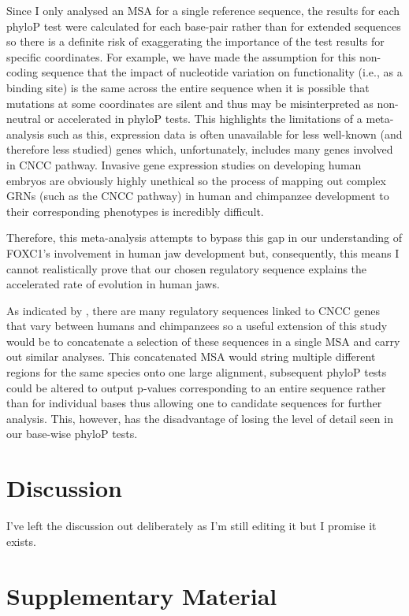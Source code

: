 \documentclass{article}[12pt]
\begin{document}
Since I only analysed an \Gls{MSA} for a single reference sequence, the results for each phyloP test were calculated for each base-pair rather than for extended sequences so there is a definite risk of exaggerating the importance of the test results for specific coordinates. For example, we have made the assumption for this non-coding sequence that the impact of nucleotide variation on functionality (i.e., as a binding site) is the same across the entire sequence when it is possible that mutations at some coordinates are silent and thus may be misinterpreted as non-neutral or accelerated in phyloP tests. This highlights the limitations of a meta-analysis such as this, expression data is often unavailable for less well-known (and therefore less studied) genes which, unfortunately, includes many genes involved in \Gls{CNCC} pathway. Invasive gene expression studies on developing human embryos are obviously highly unethical so the process of mapping out complex \Glspl{GRN} (such as the CNCC pathway) in human and chimpanzee development to their corresponding phenotypes is incredibly difficult. 

Therefore, this meta-analysis attempts to bypass this gap in our understanding of FOXC1’s involvement in human jaw development but, consequently, this means I cannot realistically prove that our chosen regulatory sequence explains the accelerated rate of evolution in human jaws.

As indicated by \cite{Prescott2015}, there are many regulatory sequences linked to CNCC genes that vary between humans and chimpanzees so a useful extension of this study would be to concatenate a selection of these sequences in a single MSA and carry out similar analyses. This concatenated MSA would string multiple different regions for the same species onto one large alignment, subsequent phyloP tests could be altered to output p-values corresponding to an entire sequence rather than for individual bases thus allowing one to candidate sequences for further analysis. This, however, has the disadvantage of losing the level of detail seen in our base-wise phyloP tests.


\section{Discussion}

I've left the discussion out deliberately as I'm still editing it but I promise it exists.

\newpage

\section*{}
\printbibliography

\section{Supplementary Material}
\end{document}
